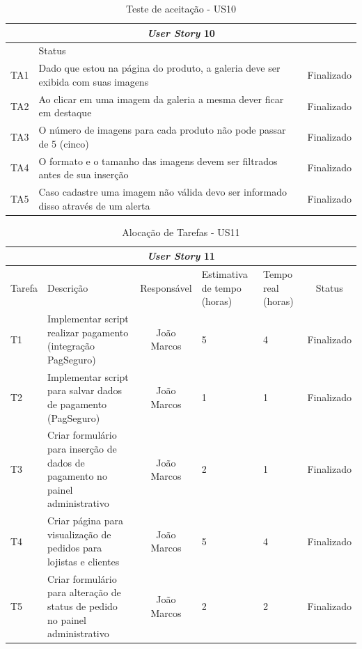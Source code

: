 \documentclass[a4paper,12pt]{monografia}
\begin{document}
\begin{longtable}{|l|p{11.8cm}|c|}
\caption{Teste de aceitação - US10}
\label{quadro:teste-aceitacao-us10}
\hline
\multicolumn{3}{|c|}{\textbf{\textit{User Story} 10}}\\
\hline		
\rowcolor{ballblue}
\multicolumn{2}{|c|}{Testes de aceitação} & Status\\	
\hline
TA1 & Dado que estou na página do produto, a galeria deve ser exibida com suas imagens & Finalizado\\
\hline
TA2 & Ao clicar em uma imagem da galeria a mesma dever ficar em destaque  & Finalizado\\
\hline
TA3 & O número de imagens para cada produto não pode passar de 5 (cinco)  & Finalizado\\
\hline
TA4 & O formato e o tamanho das imagens devem ser filtrados antes de sua inserção  & Finalizado\\
\hline
TA5 & Caso cadastre uma imagem não válida devo ser informado disso através de um alerta  & Finalizado\\
\hline
\end{longtable}


\begin{longtable}{|p{1.5cm}|p{3.5cm}|c|p{2cm}|p{2cm}|c|}
\caption{Alocação de Tarefas - US11}
\label{quadro:tat-us11}
\hline
\multicolumn{6}{|c|}{\textbf{\textit{User Story} 11}}\\
\hline		
\rowcolor{ballblue}
Tarefa & Descrição & Responsável & Estimativa de tempo (horas) & Tempo real (horas) & Status\\
\hline
T1 & Implementar script realizar pagamento (integração PagSeguro) & João Marcos & 5 & 4 & Finalizado\\
\hline
T2 & Implementar script para salvar dados de pagamento (PagSeguro) & João Marcos & 1 & 1 & Finalizado\\
\hline
T3 & Criar formulário para inserção de dados de pagamento no painel administrativo & João Marcos & 2 & 1 & Finalizado\\
\hline
T4 & Criar página para visualização de pedidos para lojistas e clientes & João Marcos & 5 & 4 & Finalizado\\
\hline
T5 & Criar formulário para alteração de status de pedido no painel administrativo & João Marcos & 2 & 2 & Finalizado\\
\hline
\end{longtable}
\end{document}
